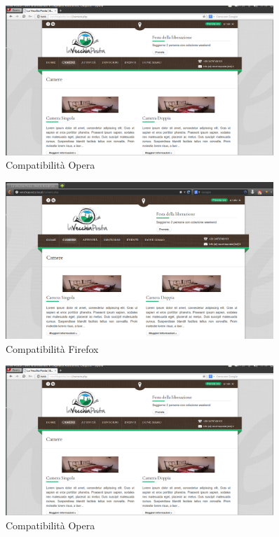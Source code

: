\documentclass[a4paper,12pt,hidelinks]{report}
\begin{document}
\begin{figure}[h!]%
    \includegraphics[width=0.9\textwidth,keepaspectratio=true]{../img/compOpera}
    \centering
    \caption{Compatibilità Opera}%
    \label{fig:compOpera}%
\end{figure}

\begin{figure}[h!]%
    \includegraphics[width=0.9\textwidth,keepaspectratio=true]{../img/compFirefox}
    \centering
    \caption{Compatibilità Firefox}%
    \label{fig:compFirefox}%
\end{figure}

\begin{figure}[h!]%
    \includegraphics[width=0.9\textwidth,keepaspectratio=true]{../img/compOpera}
    \centering
    \caption{Compatibilità Opera}%
    \label{fig:compOpera}%
\end{figure}
\end{document}
